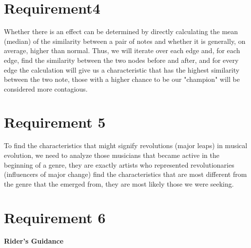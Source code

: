 \documentclass[12pt]{article}
\begin{document}
\section{Requirement4}\Large
Whether there is an effect can be determined by directly calculating the mean (median) of the similarity between a pair  of notes and whether it is generally,
on average, higher than normal. Thus, we will iterate over each edge and, for each edge, find the similarity between the two nodes before and after, and for every
edge the calculation will give us a characteristic that has the highest similarity between the two note, those with a higher chance to be our "champion" will be considered
more contagious.
\section{Requirement 5}
To find the characteristics that might signify revolutions (major leaps) in musical evolution, we need to analyze those musicians that became active in the beginning of
a genre, they are exactly artists who represented revolutionaries (influencers of major
change) find the characteristics that are most different from the genre that the emerged from, they are most likely those we were seeking.
\newpage
\section{Requirement 6}
\begin{center}
    \huge \textbf{Rider's Guidance}
\end{center}



\end{document}
